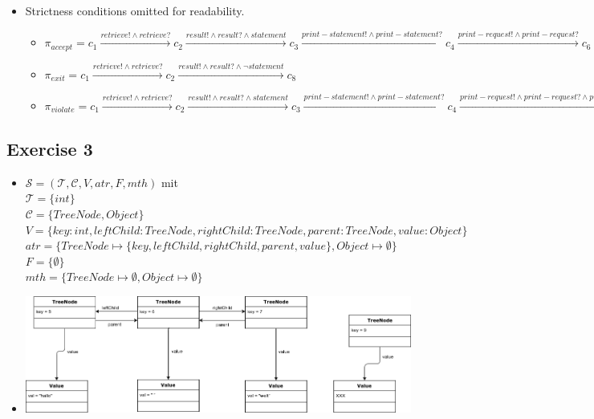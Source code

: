 \documentclass{scrartcl}
\begin{document}
\begin{itemize}
    \item[(iii)] Strictness conditions omitted for readability.\\
        \begin{itemize}


         \item[a)] $ \pi_{accept} = c_1 \xrightarrow{retrieve! \land retrieve?} c_2 \xrightarrow{result! \land result? \land statement} c_3 \xrightarrow{print-statement! \land print-statement?} c_4 \xrightarrow{print-request! \land print-request?} c_6 \xrightarrow{confirm! \land confirm?} c_7 \xrightarrow{main-menu! \land main-menu?} c_8$

         \item[b)] $ \pi_{exit} = c_1 \xrightarrow{retrieve! \land retrieve?} c_2 \xrightarrow{result! \land result? \land \neg statement} c_8 $

         \item[c)] $ \pi_{violate} = c_1 \xrightarrow{retrieve! \land retrieve?} c_2 \xrightarrow{result! \land result? \land statement} c_3 \xrightarrow{print-statement! \land print-statement?} c_4 \xrightarrow{print-request! \land print-request? \land print} illegal$
        \end{itemize}
\end{itemize}



\subsection*{Exercise 3}

\begin{itemize}
   \item [i]
        $\mathscr{S} = (\mathscr{T}, \mathscr{C}, V, atr, F, mth)$ mit \\
        $\mathscr{T} = \{int\}$ \\
        $\mathscr{C} = \{TreeNode, Object\}$ \\
        $V = \{key : int, leftChild : TreeNode, rightChild : TreeNode, parent : TreeNode, value : Object \}$ \\
        $atr = \{ TreeNode \mapsto \{key, leftChild, rightChild, parent, value\}, Object \mapsto \emptyset \}$ \\
        $F = \{ \emptyset \}$ \\
        $mth = \{ TreeNode \mapsto \emptyset, Object \mapsto \emptyset \}$
    \item[ii]
        \includegraphics[width=\textwidth]{NodeExample.png}
\end{itemize}
\end{document}
